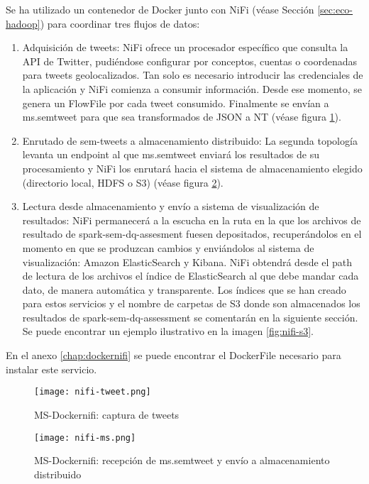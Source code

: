Se ha utilizado un contenedor de Docker junto con NiFi (véase Sección
\ref{sec:eco-hadoop}) para coordinar tres flujos de datos: 

\begin{enumerate}
\item Adquisición de tweets: NiFi ofrece un procesador específico que consulta
  la \acs{API} de Twitter, pudiéndose configurar por conceptos, cuentas o coordenadas
  para tweets geolocalizados. Tan solo es necesario introducir las credenciales
  de la aplicación y NiFi comienza a consumir información. Desde ese momento, se
  genera un FlowFile por cada tweet consumido. Finalmente se envían a ms.semtweet para que
  sea transformados de \acs{JSON} a \acs{NT} (véase figura \ref{fig:nifi-tweet}).
\item Enrutado de sem-tweets a almacenamiento distribuido: La segunda topología
  levanta un endpoint al que ms.semtweet enviará los resultados de su
  procesamiento y NiFi los enrutará hacia el sistema de almacenamiento elegido
  (directorio local, \acs{HDFS} o S3) (véase figura \ref{fig:nifi-ms}). 
\item Lectura desde almacenamiento y envío a sistema de visualización de
  resultados: NiFi permanecerá a la escucha en la ruta en la que los archivos de
  resultado de spark-sem-dq-assesment fuesen depositados, recuperándolos en el
  momento en que se produzcan cambios y enviándolos al sistema de visualización:
  Amazon 
  ElasticSearch y Kibana. NiFi obtendrá desde el path de lectura de los archivos
  el índice de ElasticSearch al que debe mandar cada dato, de manera automática
  y transparente.  Los índices
  que se han creado para estos servicios y el nombre de carpetas de S3 donde son
  almacenados los resultados de spark-sem-dq-assessment se comentarán en la
  siguiente sección. Se puede encontrar un
  ejemplo ilustrativo en la imagen  \ref{fig:nifi-s3}. 
\end{enumerate}

En el anexo \ref{chap:dockernifi} se puede encontrar el DockerFile necesario
para instalar este servicio. 

\begin{figure}[!h]
  \begin{center}
    \texttt{[image: nifi-tweet.png]} 
    \caption{MS-Dockernifi: captura de tweets}
    \label{fig:nifi-tweet}
  \end{center}
\end{figure}

\begin{figure}[!h]
  \begin{center}
    \texttt{[image: nifi-ms.png]} 
    \caption{MS-Dockernifi: recepción de ms.semtweet y envío a almacenamiento distribuido}
    \label{fig:nifi-ms}
  \end{center}
\end{figure}

